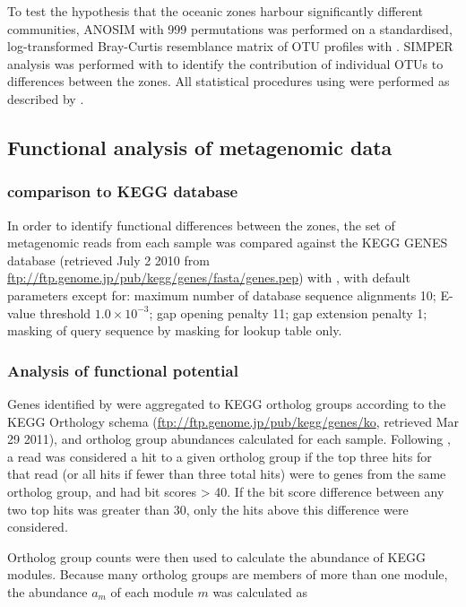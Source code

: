 To test the hypothesis that the oceanic zones harbour significantly different communities, \ac{ANOSIM} with 999 permutations was performed on a standardised, log-transformed Bray-Curtis resemblance matrix of \ac{OTU} profiles with .
\ac{SIMPER} analysis was performed with  to identify the contribution of individual \acp{OTU} to differences between the zones. 
All statistical procedures using  were performed as described by \citet{Clarke:2001ut}.

\subsection{Functional analysis of metagenomic data}

\subsubsection{ comparison to \ac{KEGG} database}

In order to identify functional differences between the zones, the set of metagenomic reads from each sample was compared against the \ac{KEGG} GENES database (retrieved July 2 2010 from \url{ftp://ftp.genome.jp/pub/kegg/genes/fasta/genes.pep}) with , with default parameters except for: maximum number of database sequence alignments 10; E-value threshold $1.0\times10^{-3}$; gap opening penalty 11; gap extension penalty 1; masking of query sequence by  masking for lookup table only.

\subsubsection{Analysis of functional potential}

Genes identified by  were aggregated to \ac{KEGG} ortholog groups according to the \ac{KEGG} Orthology schema (\url{ftp://ftp.genome.jp/pub/kegg/genes/ko}, retrieved Mar 29 2011), and ortholog group abundances calculated for each sample. 
Following \citet{Coleman:2010jj}, a read was considered a hit to a given ortholog group if the top three hits for that read (or all hits if fewer than three total hits) were to genes from the same ortholog group, and had bit scores \textgreater{} 40. 
If the bit score difference between any two top hits was greater than 30, only the hits above this difference were considered.

Ortholog group counts were then used to calculate the abundance of KEGG modules.
Because many ortholog groups are members of more than one module, the abundance $a_m$ of each module $m$ was calculated as 

